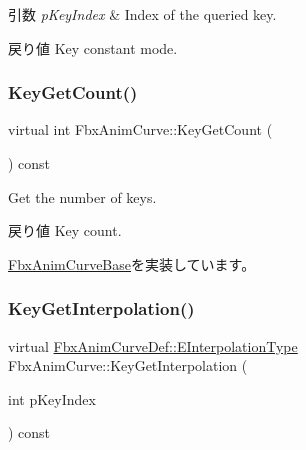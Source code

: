 \begin{DoxyParams}{引数}
{\em p\+Key\+Index} & Index of the queried key. \\
\hline
\end{DoxyParams}
\begin{DoxyReturn}{戻り値}
Key constant mode. 
\end{DoxyReturn}
\mbox{\label{class_fbx_anim_curve_a08de74d6ef6469be37abd1df0836eac9}} 
\subsubsection{\texorpdfstring{Key\+Get\+Count()}{KeyGetCount()}}
{\footnotesize\ttfamily virtual int Fbx\+Anim\+Curve\+::\+Key\+Get\+Count (\begin{DoxyParamCaption}{ }\end{DoxyParamCaption}) const\hspace{0.3cm}{\ttfamily [pure virtual]}}

Get the number of keys. \begin{DoxyReturn}{戻り値}
Key count. 
\end{DoxyReturn}


\hyperlink{class_fbx_anim_curve_base_a36fcc14d1c1944341da57085956a3f59}{Fbx\+Anim\+Curve\+Base}を実装しています。

\mbox{\label{class_fbx_anim_curve_a14158288d26a4fc08c6ae7b2ff8d6638}} 
\subsubsection{\texorpdfstring{Key\+Get\+Interpolation()}{KeyGetInterpolation()}}
{\footnotesize\ttfamily virtual \hyperlink{class_fbx_anim_curve_def_add2ab7d10d856ab0868cc9b143d59ea5}{Fbx\+Anim\+Curve\+Def\+::\+E\+Interpolation\+Type} Fbx\+Anim\+Curve\+::\+Key\+Get\+Interpolation (\begin{DoxyParamCaption}\item[{int}]{p\+Key\+Index }\end{DoxyParamCaption}) const\hspace{0.3cm}{\ttfamily [pure virtual]}}

